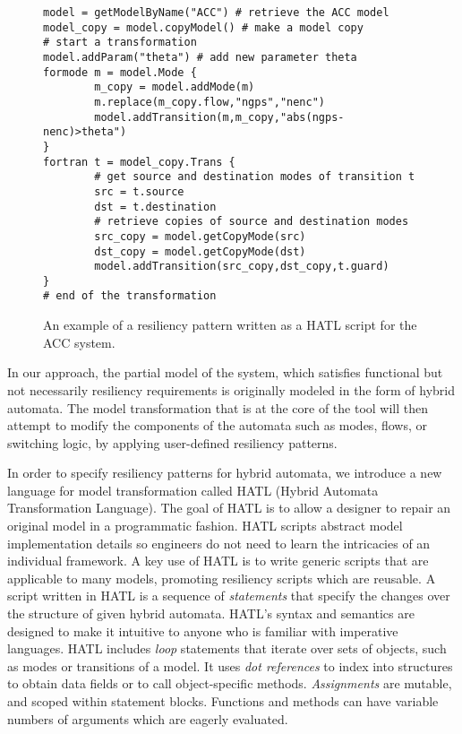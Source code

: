 \begin{figure}[!t]%
\begin{lstlisting}[basicstyle=\ttfamily\footnotesize, numbers=none]
model = getModelByName("ACC") # retrieve the ACC model
model_copy = model.copyModel() # make a model copy 
# start a transformation  
model.addParam("theta") # add new parameter theta
formode m = model.Mode {
		m_copy = model.addMode(m)
		m.replace(m_copy.flow,"ngps","nenc")
		model.addTransition(m,m_copy,"abs(ngps-nenc)>theta")
}
fortran t = model_copy.Trans {
		# get source and destination modes of transition t
		src = t.source
		dst = t.destination
		# retrieve copies of source and destination modes
		src_copy = model.getCopyMode(src)
		dst_copy = model.getCopyMode(dst)
		model.addTransition(src_copy,dst_copy,t.guard)
}
# end of the transformation
\end{lstlisting}
\vspace{-0.5em}%
\caption{An example of a resiliency pattern written as a HATL script for the ACC system.}%
%
	\vspace{-1.5em}%
\end{figure}

In our approach, the partial model of the system, which satisfies functional but not necessarily resiliency requirements is originally modeled in the form of hybrid automata. The model transformation that is at the core of the \toolreaffirm tool will then attempt to modify the components of the automata such as modes, flows, or switching logic, by applying user-defined resiliency patterns.


In order to specify resiliency patterns for hybrid automata, we introduce a new language for model transformation called HATL (Hybrid Automata Transformation Language). The goal of HATL is to allow a designer to repair an original model in a programmatic fashion. HATL scripts abstract model implementation details so engineers do not need to learn the intricacies of an individual framework. A key use of HATL is to write generic scripts that are applicable to many models, promoting resiliency scripts which are reusable.
%
A script written in HATL is a sequence of \emph{statements} that specify the changes over the structure of given hybrid automata. HATL's syntax and semantics are designed to make it intuitive to anyone who is familiar with imperative languages. HATL includes \emph{loop} statements that iterate over sets of objects, such as modes or transitions of a model. It uses \emph{dot references} to index into structures to obtain data fields or to call object-specific methods. \emph{Assignments} are mutable, and scoped within statement blocks. Functions and methods can have variable numbers of arguments which are eagerly evaluated.

